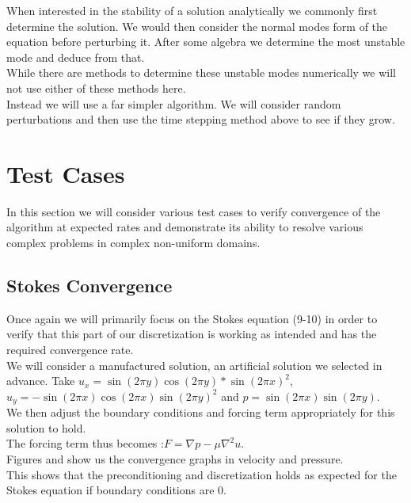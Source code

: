 \documentclass[11pt,twoside,a4paper]{article}
\begin{document}
When interested in the stability of a solution analytically we commonly first determine the solution. We would then consider the normal modes form of the equation before perturbing it. After some algebra we determine the most unstable mode and deduce from that.\\
While there are methods to determine these unstable modes numerically we will not use either of these methods here.\\
Instead we will use a far simpler algorithm.
We will consider random perturbations and then use the time stepping method above to see if they grow.

\section{Test Cases}
In this section we will consider various test cases to verify convergence of the algorithm at expected rates and demonstrate its ability to resolve various complex problems in complex non-uniform domains.
\subsection{Stokes Convergence}

Once again we will primarily focus on the Stokes equation (9-10) in order to verify that this part of our discretization is working as intended and has the required convergence rate.\\
We will consider a manufactured solution, an artificial solution we selected in advance. Take $u_x = \sin(2 \pi y) \cos(2 \pi y)*\sin(2 \pi x)^2$, $u_y= -\sin(2 \pi x) \cos(2 \pi x) \sin(2 \pi y)^2$ and $p = \sin(2 \pi x) \sin(2 \pi y)$.\\
We then adjust the boundary conditions and forcing term appropriately for this solution to hold.\\
 The forcing term thus becomes :$F = \nabla p - \mu \nabla^2 u$.\\
Figures and show us the convergence graphs in velocity and pressure.\\
This shows that the preconditioning and discretization holds as expected for the Stokes equation if boundary conditions are $0$.
\\
\end{document}
